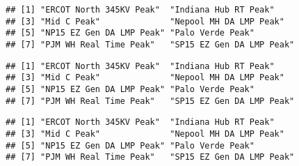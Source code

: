 \documentclass[
]{article}
\newenvironment{Shaded}{\begin{snugshade}}{\end{snugshade}}
\newcommand{\AttributeTok}[1]{\textcolor[rgb]{0.13,0.29,0.53}{#1}}
\newcommand{\CommentTok}[1]{\textcolor[rgb]{0.56,0.35,0.01}{\textit{#1}}}
\newcommand{\FunctionTok}[1]{\textcolor[rgb]{0.13,0.29,0.53}{\textbf{#1}}}
\newcommand{\NormalTok}[1]{#1}
\newcommand{\SpecialCharTok}[1]{\textcolor[rgb]{0.81,0.36,0.00}{\textbf{#1}}}
\newcommand{\StringTok}[1]{\textcolor[rgb]{0.31,0.60,0.02}{#1}}
\begin{document}
\begin{Shaded}
\end{Shaded}

\begin{verbatim}
## [1] "ERCOT North 345KV Peak"  "Indiana Hub RT Peak"    
## [3] "Mid C Peak"              "Nepool MH DA LMP Peak"  
## [5] "NP15 EZ Gen DA LMP Peak" "Palo Verde Peak"        
## [7] "PJM WH Real Time Peak"   "SP15 EZ Gen DA LMP Peak"
\end{verbatim}

\begin{Shaded}
\end{Shaded}

\begin{verbatim}
## [1] "ERCOT North 345KV Peak"  "Indiana Hub RT Peak"    
## [3] "Mid C Peak"              "Nepool MH DA LMP Peak"  
## [5] "NP15 EZ Gen DA LMP Peak" "Palo Verde Peak"        
## [7] "PJM WH Real Time Peak"   "SP15 EZ Gen DA LMP Peak"
\end{verbatim}

\begin{Shaded}
\end{Shaded}

\begin{verbatim}
## [1] "ERCOT North 345KV Peak"  "Indiana Hub RT Peak"    
## [3] "Mid C Peak"              "Nepool MH DA LMP Peak"  
## [5] "NP15 EZ Gen DA LMP Peak" "Palo Verde Peak"        
## [7] "PJM WH Real Time Peak"   "SP15 EZ Gen DA LMP Peak"
\end{verbatim}

\begin{Shaded}
\end{Shaded}
\end{document}
